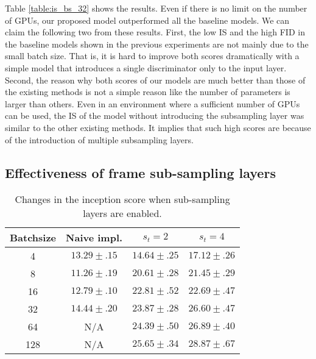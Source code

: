 \documentclass[twocolumn]{svjour3}
\def\Table#1{Table \ref{table:#1}}
\begin{document}
\Table{is_bs_32} shows the results. Even if there is no limit on the number of GPUs,
our proposed model outperformed all the baseline models.
We can claim the following two from these results.
First, the low IS and the high FID in the baseline models shown in the previous experiments
are not mainly due to the small batch size.
That is, it is hard to improve both scores dramatically
with a simple model that introduces a single discriminator only to the input layer.
Second, the reason why both scores of our models are much better than those of the existing methods
is not a simple reason like the number of parameters is larger than others.
Even in an environment where a sufficient number of GPUs can be used,
the IS of the model without introducing the subsampling layer was similar to the other existing methods.
It implies that such high scores are because of the introduction of multiple subsampling layers.
































\subsection{Effectiveness of frame sub-sampling layers}
\label{sec:frame_subsampling}












\begin{table}
\centering
{\renewcommand{\arraystretch}{1.2}
\begin{tabular}{c|ccc}
Batchsize & Naive impl. & $s_t = 2$ & $s_t = 4$ \\ \hline \hline
4 & {$13.29 \pm .15$} & {$14.64 \pm .25$} & ${17.12 \pm .26}$ \\
8 & {$11.26 \pm .19$} & {$20.61 \pm .28$} & ${21.45 \pm .29}$ \\
16 & {$12.79 \pm .10$} & {$22.81 \pm .52$} & ${22.69 \pm .47}$ \\
32 & {$14.44 \pm .20$} & {$23.87 \pm .28$} & ${26.60 \pm .47}$ \\
64 & N/A & {$24.39 \pm .50$} & ${26.89 \pm .40}$ \\
128 & N/A & {$25.65 \pm .34$} & {$28.87 \pm .67$} \\ \hline
\end{tabular}
}
\caption{Changes in the inception score when sub-sampling layers are enabled.}
\label{table:fr_is}
\end{table}
\end{document}

